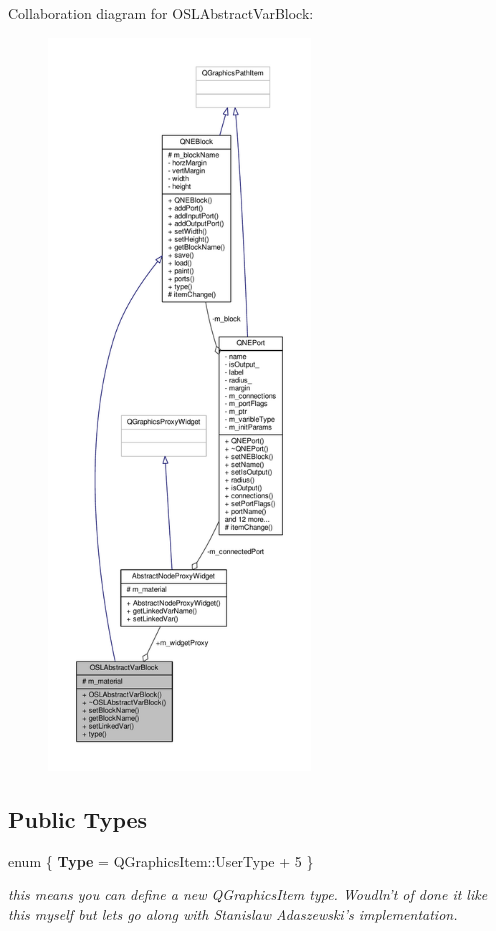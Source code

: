 Collaboration diagram for O\-S\-L\-Abstract\-Var\-Block\-:
\nopagebreak
\begin{figure}[H]
\begin{center}
\leavevmode
\includegraphics[height=550pt]{class_o_s_l_abstract_var_block__coll__graph}
\end{center}
\end{figure}
\subsection*{Public Types}
\begin{DoxyCompactItemize}
\item 
enum \{ {\bfseries Type} = Q\-Graphics\-Item\-:\-:User\-Type + 5
 \}
\begin{DoxyCompactList}\small\item\em this means you can define a new Q\-Graphics\-Item type. Woudln't of done it like this myself but lets go along with Stanislaw Adaszewski's implementation. \end{DoxyCompactList}\end{DoxyCompactItemize}
